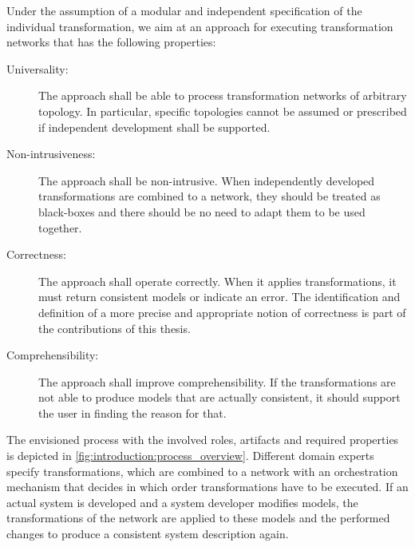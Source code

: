 Under the assumption of a modular and independent specification of the individual transformation, we aim at an approach for executing transformation networks that has the following properties:
\begin{description}
    \item[Universality:] The approach shall be able to process transformation networks of arbitrary topology. In particular, specific topologies cannot be assumed or prescribed if independent development shall be supported.
    \item[Non-intrusiveness:] The approach shall be non-intrusive. When independently developed transformations are combined to a network, they should be treated as black-boxes and there should be no need to adapt them to be used together.
    \item[Correctness:] The approach shall operate correctly. When it applies transformations, it must return consistent models or indicate an error. The identification and definition of a more precise and appropriate notion of correctness is part of the contributions of this thesis.
    \item[Comprehensibility:] The approach shall improve comprehensibility. If the transformations are not able to produce models that are actually consistent, it should support the user in finding the reason for that.
\end{description}
The envisioned process with the involved roles, artifacts and required properties is depicted in \autoref{fig:introduction:process_overview}.
Different domain experts specify transformations, which are combined to a network with an orchestration mechanism that decides in which order transformations have to be executed. If an actual system is developed and a system developer modifies models, the transformations of the network are applied to these models and the performed changes to produce a consistent system description again.

